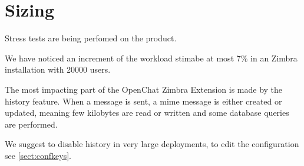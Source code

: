 \section{Sizing}
\label{sect:sizing}

Stress tests are being perfomed on the product.

We have noticed an increment of the workload stimabe at most 7\% in an Zimbra installation with 20000 users.

The most impacting part of the OpenChat Zimbra Extension is made by the history feature. When a message is sent, a mime
message is either created or updated, meaning few kilobytes are read or written and some database queries are performed.

\begin{info}
    We suggest to disable history in very large deployments, to edit the configuration see \autoref{sect:confkeys}.
\end{info}
